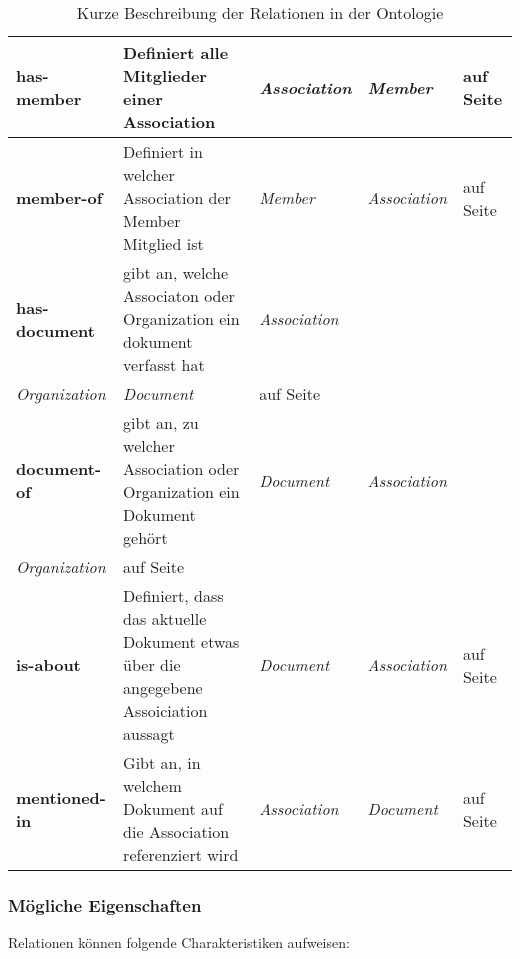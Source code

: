 \documentclass[
    11pt,
    latin1,
    a4paper,
    oneside
]{scrreprt}
\begin{document}
\begin{table}[h]
\begin{tabular}{ | l | p{4cm} | p{3cm} | l | p{3cm} | }
		\textbf{has-member} & Definiert alle Mitglieder einer Association & \emph{Association} & \emph{Member} & \nameref{sec:rel_hasmember} auf Seite \pageref{sec:rel_hasmember} \\ \hline
		\textbf{member-of} & Definiert in welcher Association der Member Mitglied ist & \emph{Member} & \emph{Association} & \nameref{sec:rel_memberof} auf Seite \pageref{sec:rel_memberof} \\ \hline
		
		\textbf{has-document} & gibt an, welche Associaton oder Organization ein dokument verfasst hat & \emph{Association} \\ \emph{Organization} & \emph{Document} & \nameref{sec:rel_hasdocument} auf Seite \pageref{sec:rel_hasdocument} \\ \hline
		\textbf{document-of} & gibt an, zu welcher Association oder Organization ein Dokument geh\"ort & \emph{Document} & \emph{Association} \\ \emph{Organization} & \nameref{sec:rel_documentof} auf Seite \pageref{sec:rel_documentof} \\ \hline
		
		\textbf{is-about} & Definiert, dass das aktuelle Dokument etwas \"uber die angegebene Assoiciation aussagt & \emph{Document} & \emph{Association} & \nameref{sec:rel_isabout} auf Seite \pageref{sec:rel_isabout} \\ \hline
		\textbf{mentioned-in} & Gibt an, in welchem Dokument auf die Association referenziert wird & \emph{Association} & \emph{Document} & \nameref{sec:rel_mentionedin} auf Seite \pageref{sec:rel_mentionedin} \\ \hline
		
	\end{tabular}
	\caption{Kurze Beschreibung der Relationen in der Ontologie}
	\label{tbl:classes}
\end{table}

\subsubsection{M\"ogliche Eigenschaften} \label{sec:relations_settings}

Relationen k\"onnen folgende Charakteristiken aufweisen:
\end{document}

